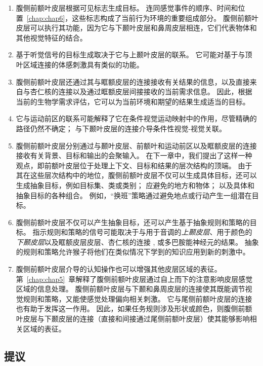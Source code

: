 \begin{enumerate}
\item 腹侧前额叶皮层根据可见标志生成目标。 
连同感觉事件的顺序、时间和位置~\ref{chap:chap6}，这些标志构成了当前行为环境的重要组成部分。
腹侧前额叶皮层可以执行其功能，因为它与下颞叶皮层和鼻周皮层相连，它们代表物体和其他视觉特征的结合。
\item 基于听觉信号的目标生成取决于它与上颞叶皮层的联系。
它可能对基于与顶叶区域连接的体感刺激具有类似的功能。
\item 腹侧前额叶皮层还通过其与眶额皮层的连接接收有关结果的信息，以及直接来自与杏仁核的连接以及通过眶额皮层间接接收的当前需求信息。
因此，根据当前的生物学需求评估，它可以为当前环境和期望的结果生成适当的目标。
\item 它与运动前区的联系可能解释了它在条件视觉运动映射中的作用，尽管精确的路径仍然不确定；
与下颞叶皮层的连接介导条件性视觉-视觉关联。
\item 腹侧前额叶皮层分别通过与颞叶皮层、前额叶和运动前区以及眶额皮层的连接接收有关背景、目标和输出的会聚输入。
在下一章中，我们提出了这样一种观点，即前额叶皮层位于处理上下文、目标和结果的层次结构的顶端。
由于其在这些层次结构中的地位，腹侧前额叶皮层不仅可以生成具体目标，还可以生成抽象目标，例如目标集、类或类别； 应避免的地方和物体； 以及具体和抽象目标的各种组合。
例如，“换班”策略通过避免地点或行动产生一组潜在目标。
\item 腹侧前额叶皮层不仅可以产生抽象目标，还可以产生基于抽象规则和策略的目标。 
指示规则和策略的信号可能取决于与用于音调的\textit{上颞皮层}\cite{wallis2001single}、用于颜色的\textit{下颞皮层}\cite{tsujimoto2010evaluating}以及眶额皮层皮层、杏仁核的连接 , 或多巴胺能神经元的结果。
抽象的规则和策略允许猴子将他们在类似情况下学到的知识应用到新的刺激中。
\item 腹侧前额叶皮层介导的认知操作也可以增强其他皮层区域的表征。
第~\ref{chap:chap5}~章解释了腹侧前额叶皮层通过自上而下的注意影响皮层感觉区域的信息处理。
腹侧前额叶皮层与下颞和鼻周皮层的连接使其既能调节视觉规则和策略，又能使感觉处理偏向相关刺激。
它与尾侧前额叶皮层的连接也有助于发挥这一作用。
因此，如果任务规则涉及形状或颜色，则腹侧前额叶皮层与下颞皮层的连接（直接和间接通过尾侧前额叶皮层）使其能够影响相关区域的表征。
\end{enumerate}




\subsection{提议}
\par

